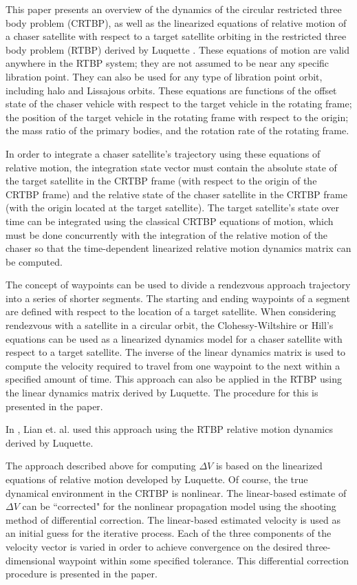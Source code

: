\documentclass[a4paper]{article}
\begin{document}
This paper presents an overview of the dynamics of the circular restricted three body problem (CRTBP), as well as the linearized equations of relative motion of a chaser satellite with respect to a target satellite orbiting in the restricted three body problem (RTBP) derived by Luquette \cite{luquette2004}. These equations of motion are valid anywhere in the RTBP system; they are not assumed to be near any specific libration point. They can also be used for any type of libration point orbit, including halo and Lissajous orbits. These equations are functions of the offset state of the chaser vehicle with respect to the target vehicle in the rotating frame; the position of the target vehicle in the rotating frame with respect to the origin; the mass ratio of the primary bodies, and the rotation rate of the rotating frame.

In order to integrate a chaser satellite's trajectory using these equations of relative motion, the integration state vector must contain the absolute state of the target satellite in the CRTBP frame (with respect to the origin of the CRTBP frame) and the relative state of the chaser satellite in the CRTBP frame (with the origin located at the target satellite).  The target satellite's state over time can be integrated using the classical CRTBP equations of motion, which must be done concurrently with the integration of the relative motion of the chaser so that the time-dependent linearized relative motion dynamics matrix can be computed.

The concept of waypoints can be used to divide a rendezvous approach trajectory into a series of shorter segments.  The starting and ending waypoints of a segment are defined with respect to the location of a target satellite.  When considering rendezvous with a satellite in a circular orbit, the Clohessy-Wiltshire or Hill's equations can be used as a linearized dynamics model for a chaser satellite with respect to a target satellite.  The inverse of the linear dynamics matrix is used to compute the velocity required to travel from one waypoint to the next within a specified amount of time.  This approach can also be applied in the RTBP using the linear dynamics matrix derived by Luquette.  The procedure for this is presented in the paper.

In  \cite{lian2011}, Lian et. al. used this approach using the RTBP relative motion dynamics derived by Luquette. 

The approach described above for computing \(\Delta V\) is based on the linearized equations of relative motion developed by Luquette.  Of course, the true dynamical environment in the CRTBP is nonlinear. The linear-based estimate of \(\Delta V\) can be ``corrected" for the nonlinear propagation model using the shooting method of differential correction.  The linear-based estimated velocity is used as an initial guess for the iterative process.  Each of the three components of the velocity vector is varied in order to achieve convergence on the desired three-dimensional waypoint within some specified tolerance. This differential correction procedure is presented in the paper.
\end{document}
